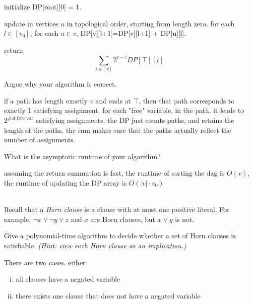 \documentclass[11pt]{article}
\begin{document}
\begin{qunlist}
\begin{qparts}
\begin{answer}
      initialize DP[root][0] = 1.

      update in vertices \(u\) in topological order, starting from length zero. for each \(l \in [v_0]\), for each \(u\in v\), DP[v][l+1]=DP[v][l+1] + DP[u][l].

      return
      \begin{equation}
        \sum_{i\in [v]} 2^{v-i} DP[\top][i]
      \end{equation}

    \end{answer}

  \item
    Argue why your algorithm is correct.

    \begin{answer}
      if a path has length exactly \(v\) and ends at \(\top\), then that path corresponds to exactly 1 satisfying assignment. for each "free" variable, in the path, it leads to \(2^{\textrm{\# of free var}}\) satisfying assignments. the DP just counts paths, and retains the length of the paths. the sum makes sure that the paths actually reflect the number of assignments.
    \end{answer}


  \item
    What is the asymptotic runtime of your algorithm?

    \begin{answer}
      assuming the return summation is fast, the runtime of sorting the dag is \(O(v)\), the runtime of updating the DP array is \(O(\vert v\vert \cdot v_0)\)
    \end{answer}

  \end{qparts}


  \\
  Recall that a \emph{Horn clause} is a clause with at most one positive literal.
  For example, $\lnot x \lor \lnot y \lor z$ and $x$ are Horn clauses, but $x \lor y$ is not.
  \begin{qparts}
  \item
    Give a polynomial-time algorithm to decide whether a set of Horn clauses is satisfiable. \emph{(Hint: view each Horn clause as an implication.)}

    \begin{answer}
      There are two cases. either
      \begin{enumerate}[i.]
        \item all clauses have a negated variable
        \item there exists one clause that does not have a negated variable
      \end{enumerate}
      ~\\


\end{answer}
\end{qparts}
\end{qunlist}
\end{document}
